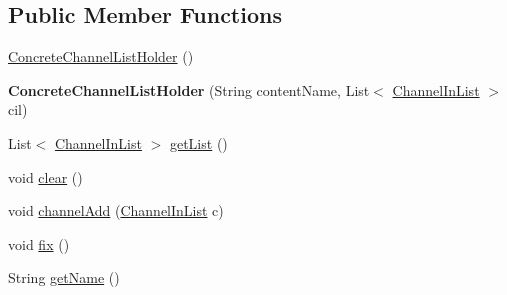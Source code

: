 \subsection*{Public Member Functions}
\begin{DoxyCompactItemize}
\item 
\hyperlink{classgov_1_1fnal_1_1ppd_1_1dd_1_1channel_1_1ConcreteChannelListHolder_ad1ee4768a28585c3b34e82263564978c}{Concrete\-Channel\-List\-Holder} ()
\item 
\hypertarget{classgov_1_1fnal_1_1ppd_1_1dd_1_1channel_1_1ConcreteChannelListHolder_a0389837f42923bf4457066031e536f4e}{{\bfseries Concrete\-Channel\-List\-Holder} (String content\-Name, List$<$ \hyperlink{interfacegov_1_1fnal_1_1ppd_1_1dd_1_1channel_1_1ChannelInList}{Channel\-In\-List} $>$ cil)}\label{classgov_1_1fnal_1_1ppd_1_1dd_1_1channel_1_1ConcreteChannelListHolder_a0389837f42923bf4457066031e536f4e}

\item 
List$<$ \hyperlink{interfacegov_1_1fnal_1_1ppd_1_1dd_1_1channel_1_1ChannelInList}{Channel\-In\-List} $>$ \hyperlink{classgov_1_1fnal_1_1ppd_1_1dd_1_1channel_1_1ConcreteChannelListHolder_affa1b398ed9fc7dbad18215765653e14}{get\-List} ()
\item 
void \hyperlink{classgov_1_1fnal_1_1ppd_1_1dd_1_1channel_1_1ConcreteChannelListHolder_aef1741e4b499729c50dce421c87938b8}{clear} ()
\item 
void \hyperlink{classgov_1_1fnal_1_1ppd_1_1dd_1_1channel_1_1ConcreteChannelListHolder_ad56aa51994e24f71e2ae6879de6d0bb7}{channel\-Add} (\hyperlink{interfacegov_1_1fnal_1_1ppd_1_1dd_1_1channel_1_1ChannelInList}{Channel\-In\-List} c)
\item 
void \hyperlink{classgov_1_1fnal_1_1ppd_1_1dd_1_1channel_1_1ConcreteChannelListHolder_aa560e7478cd1776380d9ff8e131c65c7}{fix} ()
\item 
String \hyperlink{classgov_1_1fnal_1_1ppd_1_1dd_1_1channel_1_1ConcreteChannelListHolder_a54e97b13a69c73cb973a184fa67c7175}{get\-Name} ()
\end{DoxyCompactItemize}


